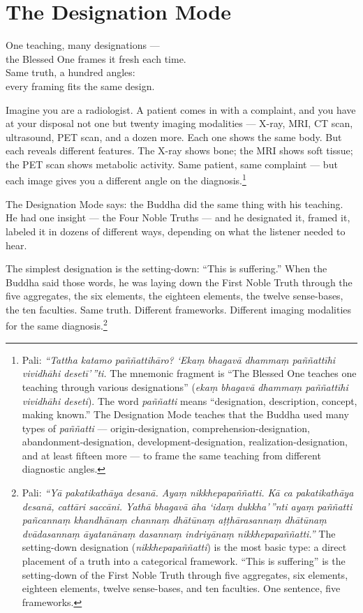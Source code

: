 \chapter{The Designation Mode}
\label{ch:designation}

\begin{versebox}
One teaching, many designations ---\\
the Blessed One frames it fresh each time.\\
Same truth, a hundred angles:\\
every framing fits the same design.
\end{versebox}

\noindent Imagine you are a radiologist. A patient comes in with a complaint, and you have at your disposal not one but twenty imaging modalities --- X-ray, MRI, CT scan, ultrasound, PET scan, and a dozen more. Each one shows the same body. But each reveals different features. The X-ray shows bone; the MRI shows soft tissue; the PET scan shows metabolic activity. Same patient, same complaint --- but each image gives you a different angle on the diagnosis.\footnote{Pali: \textit{``Tattha katamo paññattihāro? `Ekaṃ bhagavā dhammaṃ paññattīhi vividhāhi desetī'\,''ti.} The mnemonic fragment is ``The Blessed One teaches one teaching through various designations'' (\textit{ekaṃ bhagavā dhammaṃ paññattīhi vividhāhi deseti}). The word \textit{paññatti} means ``designation, description, concept, making known.'' The Designation Mode teaches that the Buddha used many types of \textit{paññatti} --- origin-designation, comprehension-designation, abandonment-designation, development-designation, realization-designation, and at least fifteen more --- to frame the same teaching from different diagnostic angles.}

The Designation Mode says: the Buddha did the same thing with his teaching. He had one insight --- the Four Noble Truths --- and he designated it, framed it, labeled it in dozens of different ways, depending on what the listener needed to hear.

The simplest designation is the setting-down: ``This is suffering.'' When the Buddha said those words, he was laying down the First Noble Truth through the five aggregates, the six elements, the eighteen elements, the twelve sense-bases, the ten faculties. Same truth. Different frameworks. Different imaging modalities for the same diagnosis.\footnote{Pali: \textit{``Yā pakatikathāya desanā. Ayaṃ nikkhepapaññatti. Kā ca pakatikathāya desanā, cattāri saccāni. Yathā bhagavā āha `idaṃ dukkha'\,''nti ayaṃ paññatti pañcannaṃ khandhānaṃ channaṃ dhātūnaṃ aṭṭhārasannaṃ dhātūnaṃ dvādasannaṃ āyatanānaṃ dasannaṃ indriyānaṃ nikkhepapaññatti.''} The setting-down designation (\textit{nikkhepapaññatti}) is the most basic type: a direct placement of a truth into a categorical framework. ``This is suffering'' is the setting-down of the First Noble Truth through five aggregates, six elements, eighteen elements, twelve sense-bases, and ten faculties. One sentence, five frameworks.}

